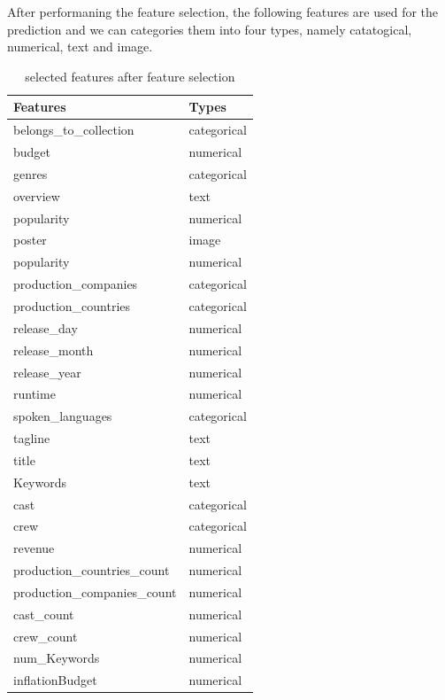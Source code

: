 \documentclass{article}
\begin{document}
After performaning the feature selection, the following features are used for the prediction
and we can categories them into four types, namely catatogical, numerical, text and image.

\begin{table}[htb]
	\caption{selected features after feature selection}
	\label{sample-table}
	\centering
	\begin{tabular}{ll}
		\toprule
		\cmidrule{1-2}
		Features &  Types \\
		\midrule
		belongs\_to\_collection & categorical \\
		budget & numerical \\
		genres & categorical \\
		overview & text \\
		popularity & numerical \\
		poster & image  \\
		popularity & numerical  \\
		production\_companies  & categorical \\
		production\_countries   & categorical\\
		release\_day  & numerical \\
		release\_month  & numerical \\
		release\_year   & numerical\\
		runtime  & numerical \\
		spoken\_languages & categorical\\
		tagline & text \\
		title & text \\
		Keywords & text \\
		cast & categorical\\
		crew & categorical\\
		revenue  & numerical \\
		production\_countries\_count & numerical\\
		production\_companies\_count & numerical\\
		cast\_count & numerical\\
		crew\_count & numerical\\
		num\_Keywords & numerical\\
		inflationBudget & numerical\\
		\midrule
	\end{tabular}
\end{table}



		

\pagebreak
\end{document}
